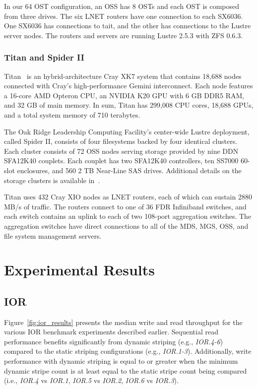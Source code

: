 \documentclass[conference,compsoc]{IEEEtran}
\begin{document}
In our 64 OST configuration, an OSS has 8 OSTs and each OST is composed from three drives. 
The six LNET routers have one connection to each SX6036. 
One SX6036 has connections to tait, and the other has connections to the Lustre server nodes.
The routers and servers are running Lustre 2.5.3 with ZFS 0.6.3. 

\subsubsection{Titan and Spider II}

Titan~\cite{titan} is an hybrid-architecture Cray XK7 system that contains 18,688 nodes connected with Cray's high-performance Gemini interconnect.
Each node features a 16-core AMD Opteron CPU, an NVIDIA K20 GPU with 6 GB DDR5 RAM, and 32 GB of main memory. 
In sum, Titan has 299,008 CPU cores, 18,688 GPUs, and a total system memory of 710 terabytes.

The Oak Ridge Leadership Computing Facility's center-wide Lustre deployment, called Spider II,
consists of four filesystems backed by four identical clusters. 
Each cluster consists of 72 OSS nodes serving storage provided by nine DDN SFA12K40 couplets.
Each couplet has two SFA12K40 controllers, ten SS7000 60-slot enclosures,
and 560 2 TB Near-Line SAS drives.
Additional details on the storage clusters is available in~\cite{sarp-cug}.

Titan uses 432 Cray XIO nodes as LNET routers, each of which can sustain 2880 MB/s of traffic.
The routers connect to one of 36 FDR Infiniband switches, and each switch contains an uplink to each of two 
108-port aggregation switches. 
The aggregation switches have direct connections to all of the MDS, MGS, OSS, and
file system management servers.

\section{Experimental Results}

\subsection{IOR}

Figure~\ref{fig:ior_results} presents the median write and read throughput for the various IOR benchmark experiments described earlier. Sequential read performance benefits significantly from dynamic striping (e.g., \emph{IOR.4-6}) compared to the static striping configurations (e.g., \emph{IOR.1-3}). Additionally, write performance with dynamic striping is equal to or greater when the minimum dynamic stripe count is at least equal to the static stripe count being compared (i.e., \emph{IOR.4} vs \emph{IOR.1}, \emph{IOR.5} vs \emph{IOR.2}, \emph{IOR.6} vs \emph{IOR.3}).
\end{document}

